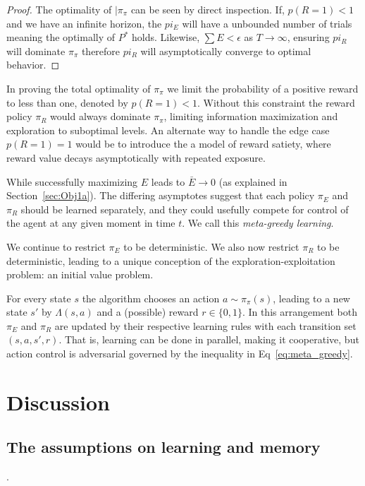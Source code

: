 \documentclass[9pt,twocolumn,twoside]{pnas-new}
\begin{document}
{{\begin{proof}
    The optimality of $|\pi_{\pi}$ can be seen by direct inspection. If, $p(R = 1) < 1$ and we have an infinite horizon, the $pi_E$ will have a unbounded number of trials meaning the optimally of $P^*$ holds. Likewise, $\sum E < \epsilon$ as $T \rightarrow \infty$, ensuring $pi_R$ will dominate $\pi_{\pi}$ therefore $pi_R$ will asymptotically converge to optimal behavior.
\end{proof}

In proving the total optimality of $\pi_{\pi}$ we limit the probability of a positive reward to less than one, denoted by $p(R = 1) < 1$. Without this constraint the reward policy $\pi_R$ would always dominate $\pi_{\pi}$, limiting information maximization and exploration to suboptimal levels. An alternate way to handle the edge case $p(R = 1) = 1$ would be to introduce the a model of reward satiety, where reward value decays asymptotically with repeated exposure. %


While successfully maximizing $E$ leads to $\bar E \rightarrow 0$ (as explained in Section~\ref{sec:Obj1a}). The differing asymptotes suggest that each policy $\pi_E$ and $\pi_R$ should be learned separately, and they could usefully compete for control of the agent at any given moment in time $t$. We call this \textit{meta-greedy learning}.

We continue to restrict $\pi_E$ to be deterministic. We also now restrict $\pi_R$ to be deterministic, leading to a unique conception of the exploration-exploitation problem: an initial value problem. 

For every state $s$ the algorithm chooses an action $a \sim \pi_{\pi}(s)$, leading to a new state $s'$ by $\Lambda(s, a)$ and a (possible) reward $r \in \{0,1\}$. In this arrangement both $\pi_E$ and $\pi_R$ are updated by their respective learning rules with each transition set $(s, a, s', r)$. That is, learning can be done in parallel, making it cooperative, but action control is adversarial governed by the inequality in Eq~\ref{eq:meta_greedy}.

\section{Discussion}

\subsection*{The assumptions on learning and memory}.
}}
\end{document}
